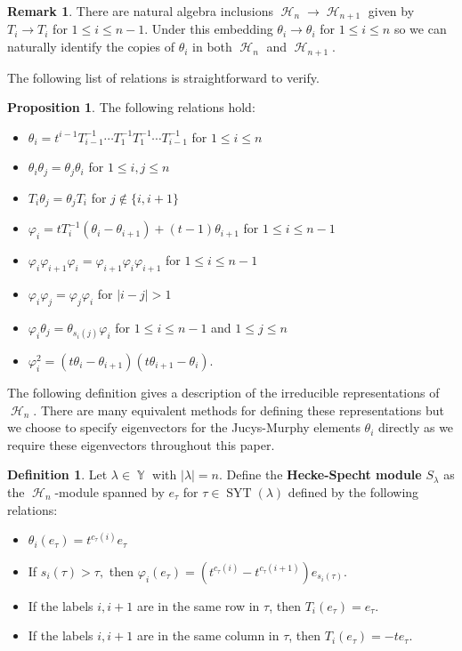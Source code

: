 \documentclass[12pt,reqno]{amsart}
\theoremstyle{definition}
\newtheorem{prop}[thm]{Proposition}
\newtheorem{defn}[thm]{Definition}
\newtheorem{remark}{Remark}
\DeclareMathOperator{\cH}{\mathcal{H}}
\DeclareMathOperator{\SYT}{\mathrm{SYT}}
\DeclareMathOperator{\Par}{\mathbb{Y}}
\begin{document}
\begin{remark}
    There are natural algebra inclusions $\cH_{n} \rightarrow \cH_{n+1}$ given by $T_i \rightarrow T_i$ for $1\leq i \leq n-1$. Under this embedding $\theta_i \rightarrow \theta_i$ for $1 \leq i \leq n$ so we can naturally identify the copies of $\theta_i$ in both $\cH_n$ and $\cH_{n+1}$.
\end{remark}

The following list of relations is straightforward to verify.

\begin{prop}\label{additional relations for finite hecke}
    The following relations hold:
    \begin{itemize}
        \item $\theta_i = t^{i-1}T_{i-1}^{-1}\cdots T_{1}^{-1}T_{1}^{-1}\cdots T_{i-1}^{-1}$ for $1\leq i \leq n$
        \item $\theta_i\theta_j = \theta_j\theta_i$ for $1\leq i,j \leq n$
        \item $T_i\theta_j = \theta_jT_i$ for $j \notin \{i,i+1\}$
        \item $\varphi_i = tT_{i}^{-1}(\theta_i - \theta_{i+1}) + (t-1)\theta_{i+1}$ for $1 \leq i \leq n-1$
        \item $\varphi_i\varphi_{i+1}\varphi_i=\varphi_{i+1}\varphi_i\varphi_{i+1}$ for $1\leq i \leq n-1$
        \item $\varphi_i\varphi_j = \varphi_j\varphi_i$ for $|i-j| >1$
        \item $\varphi_{i}\theta_j = \theta_{s_i(j)}\varphi_{i}$ for $1\leq i \leq n-1$ and $1 \leq j \leq n$
        \item $\varphi_i^{2} = (t\theta_i-\theta_{i+1})(t\theta_{i+1}-\theta_{i}).$
    \end{itemize}
\end{prop}


The following definition gives a description of the irreducible representations of $\cH_n$. There are many equivalent methods for defining these representations but we choose to specify eigenvectors for the Jucys-Murphy elements $\theta_i$ directly as we require these eigenvectors throughout this paper.

\begin{defn}\label{irreps for finite hecke defn}
    Let $\lambda \in \Par$ with $|\lambda| = n$. Define the \textbf{Hecke-Specht module} $S_{\lambda}$ as the $\cH_n$-module spanned by $e_{\tau}$ for $\tau \in \SYT(\lambda)$ defined by the following relations:
    \begin{itemize}
        \item $\theta_i(e_{\tau}) = t^{c_{\tau}(i)}e_{\tau}$
        \item If $s_i(\tau) > \tau,$ then $\varphi_i(e_{\tau}) = (t^{c_{\tau}(i)}-t^{c_{\tau}(i+1)})e_{s_i(\tau)}.$
        \item If the labels $i,i+1$ are in the same row in $\tau$, then $T_i(e_{\tau}) = e_{\tau}.$
        \item If the labels $i,i+1$ are in the same column in $\tau$, then $T_i(e_{\tau}) = -te_{\tau}.$
    \end{itemize}
\end{defn}
\end{document}
